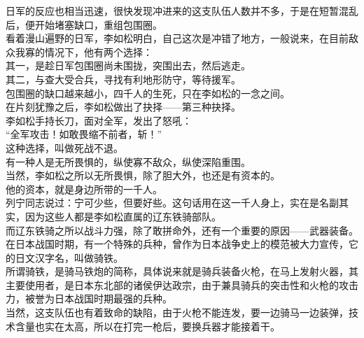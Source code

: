 \begin{multicols}{\theparacolNo}
日军的反应也相当迅速，很快发现冲进来的这支队伍人数并不多，于是在短暂混乱后，便开始堵塞缺口，重组包围圈。\\

看着漫山遍野的日军，李如松明白，自己这次是冲错了地方，一般说来，在目前敌众我寡的情况下，他有两个选择：\\

其一，是趁日军包围圈尚未围拢，突围出去，然后逃走。\\

其二，与查大受合兵，寻找有利地形防守，等待援军。\\

包围圈的缺口越来越小，四千人的生死，只在李如松的一念之间。\\

在片刻犹豫之后，李如松做出了抉择——第三种抉择。\\

李如松手持长刀，面对全军，发出了怒吼：\\

“全军攻击！如敢畏缩不前者，斩！”\\

这种选择，叫做死战不退。\\

有一种人是无所畏惧的，纵使寡不敌众，纵使深陷重围。\\

当然，李如松之所以无所畏惧，除了胆大外，也还是有资本的。\\

他的资本，就是身边所带的一千人。\\

列宁同志说过：宁可少些，但要好些。这句话用在这一千人身上，实在是名副其实，因为这些人都是李如松直属的辽东铁骑部队。\\

而辽东铁骑之所以战斗力强，除了敢拼命外，还有一个重要的原因——武器装备。\\

在日本战国时期，有一个特殊的兵种，曾作为日本战争史上的模范被大力宣传，它的日文汉字名，叫做骑铁。\\

所谓骑铁，是骑马铁炮的简称，具体说来就是骑兵装备火枪，在马上发射火器，其主要使用者，是日本东北部的诸侯伊达政宗，由于兼具骑兵的突击性和火枪的攻击力，被誉为日本战国时期最强的兵种。\\

当然，这支队伍也有着致命的缺陷，由于火枪不能连发，要一边骑马一边装弹，技术含量也实在太高，所以在打完一枪后，要换兵器才能接着干。\\


\end{multicols}
